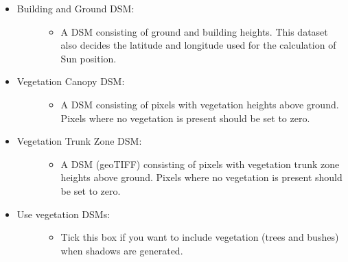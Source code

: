 \documentclass[letterpaper,10pt,english]{sphinxmanual}
\begin{document}
\begin{itemize}
\begin{description}
\end{description}

\item {} \begin{description}
\item[{Building and Ground DSM:}] \leavevmode\begin{itemize}
\item {} 
A DSM consisting of ground and building heights. This dataset also decides the latitude and longitude used for the calculation of Sun position.

\end{itemize}

\end{description}

\item {} \begin{description}
\item[{Vegetation Canopy DSM:}] \leavevmode\begin{itemize}
\item {} 
A DSM consisting of pixels with vegetation heights above ground. Pixels where no vegetation is present should be set to zero.

\end{itemize}

\end{description}

\item {} \begin{description}
\item[{Vegetation Trunk Zone DSM:}] \leavevmode\begin{itemize}
\item {} 
A DSM (geoTIFF) consisting of pixels with vegetation trunk zone heights above ground. Pixels where no vegetation is present should be set to zero.

\end{itemize}

\end{description}

\item {} \begin{description}
\item[{Use vegetation DSMs:}] \leavevmode\begin{itemize}
\item {} 
Tick this box if you want to include vegetation (trees and bushes) when shadows are generated.

\end{itemize}


\end{description}
\end{itemize}
\end{document}
